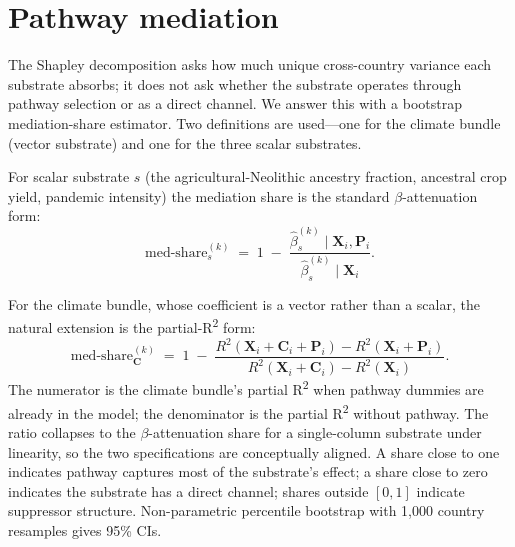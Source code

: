 \documentclass[11pt,letterpaper]{article}
\begin{document}
\begin{table}[H]
  \centering
  \caption{Full-specification OLS estimates of equation~\eqref{eq:shapley-spec} for the six outcomes. Climate bundle expands into its four primitives ($\bar T$, $\bar P$, $\sigma_v^T$, $\sigma_v^P$); functional-allele bundle expands into eight SNP columns. HC3 standard errors in parentheses. Pathway dummies included as controls (coefficients suppressed).}
  \label{tab:full-ols}
  \scriptsize
  
\end{table}

\section{Pathway mediation}
\label{sec:mediation}

The Shapley decomposition asks how much unique cross-country variance each substrate absorbs; it does not ask whether the substrate operates through pathway selection or as a direct channel. We answer this with a bootstrap mediation-share estimator. Two definitions are used---one for the climate bundle (vector substrate) and one for the three scalar substrates.

For scalar substrate $s$ (the agricultural-Neolithic ancestry fraction, ancestral crop yield, pandemic intensity) the mediation share is the standard $\beta$-attenuation form:
\begin{equation}
  \text{med-share}_s^{(k)} \;=\; 1 \;-\; \frac{\hat{\beta}_s^{(k)} \mid \mathbf{X}_i, \mathbf{P}_i}{\hat{\beta}_s^{(k)} \mid \mathbf{X}_i}.
  \label{eq:mediation-beta}
\end{equation}

For the climate bundle, whose coefficient is a vector rather than a scalar, the natural extension is the partial-R\textsuperscript{2} form:
\begin{equation}
  \text{med-share}_{\mathbf{C}}^{(k)} \;=\; 1 \;-\; \frac{R^2(\mathbf{X}_i + \mathbf{C}_i + \mathbf{P}_i) - R^2(\mathbf{X}_i + \mathbf{P}_i)}{R^2(\mathbf{X}_i + \mathbf{C}_i) - R^2(\mathbf{X}_i)}.
  \label{eq:mediation-r2}
\end{equation}
The numerator is the climate bundle's partial R\textsuperscript{2} when pathway dummies are already in the model; the denominator is the partial R\textsuperscript{2} without pathway. The ratio collapses to the $\beta$-attenuation share for a single-column substrate under linearity, so the two specifications are conceptually aligned. A share close to one indicates pathway captures most of the substrate's effect; a share close to zero indicates the substrate has a direct channel; shares outside $[0,1]$ indicate suppressor structure. Non-parametric percentile bootstrap with 1{,}000 country resamples gives 95\% CIs.
\end{document}

